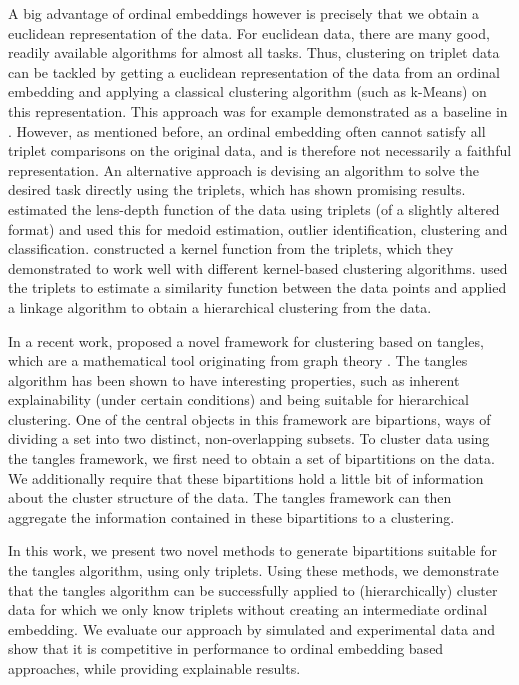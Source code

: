 A big advantage of ordinal embeddings however is precisely that we obtain a euclidean representation of the data. For euclidean data, there are many good, readily available algorithms for almost all tasks. 
Thus, clustering on triplet data can be tackled by getting a euclidean representation of the data
from an ordinal embedding and applying a classical clustering algorithm (such as k-Means) on 
this representation. This approach was for example demonstrated as a baseline in \citep{kleindessnerLensDepthFunction2017}. However, as mentioned before, an ordinal embedding 
often cannot satisfy all triplet comparisons on the original data, and is therefore not 
necessarily a faithful representation. 
An alternative approach is devising an algorithm to solve the desired task directly 
using the triplets, which has shown promising results.
\citep{kleindessnerLensDepthFunction2017} estimated the lens-depth function
of the data using triplets (of a slightly altered format) and used this for 
medoid estimation, outlier identification, clustering and classification. 
\citep{kleindessnerKernelFunctionsBased2017} constructed a kernel function from
the triplets, which they demonstrated to work well with 
different kernel-based clustering algorithms.
\citep{ghoshdastidarFoundationsComparisonBasedHierarchical2019} used the 
triplets to estimate a similarity function between the data points and applied 
a linkage algorithm to obtain a hierarchical clustering from the data.

In a recent work, \cite{klepperClusteringTanglesAlgorithmic2021} proposed a novel framework
for clustering based on tangles, which are a mathematical tool originating from graph theory 
\citep{robertsonGraphMinorsObstructions1991}. The tangles algorithm has been shown to have 
interesting properties, such as inherent explainability (under certain conditions) and being suitable for hierarchical clustering.
One of the central objects in this framework are bipartions, ways of dividing a set into
two distinct, non-overlapping subsets. To cluster data using the tangles framework, we first
need to obtain a set of bipartitions on the data. We additionally require that these bipartitions
hold a little bit of information about the cluster structure of the data. The 
tangles framework can then aggregate the information contained in these bipartitions to a
clustering. 

In this work, we present two novel methods to generate bipartitions suitable for the
tangles algorithm, using only triplets. Using these methods, we 
demonstrate that the tangles algorithm can be successfully applied to (hierarchically) cluster data for which we only know triplets without creating an intermediate ordinal embedding. 
We evaluate our approach by simulated and experimental data and show that it is competitive 
in performance to ordinal embedding based approaches, while providing explainable results. 

